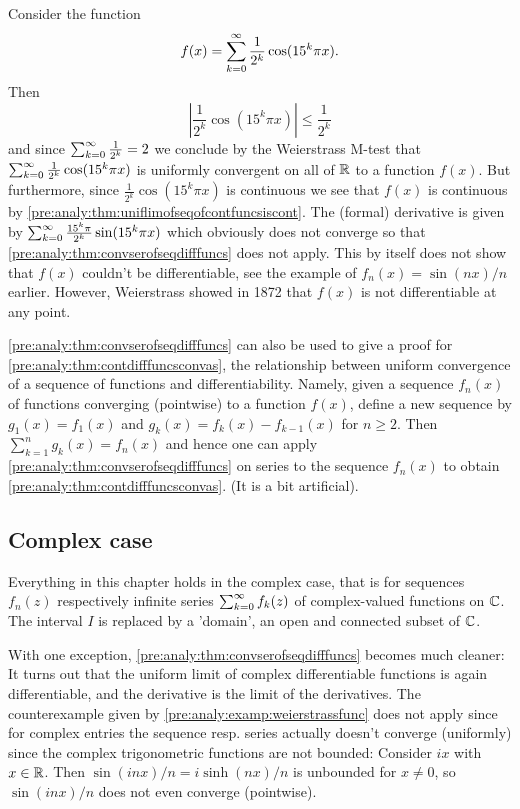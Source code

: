 \documentclass[10pt, a4paper]{article}
\begin{document}
\begin{example}\label{pre:analy:examp:weierstrassfunc}
    Consider the function
    \[
    f(x) = \sum_{k = 0}^{\infty}\frac{1}{2 ^ k}\cos(15 ^ k\pi x).
    \]
    Then
    \[
    \left|\frac{1}{2 ^ k}\cos(15 ^ k\pi x)\right| \leq \frac{1}{2 ^ k}
    \]
    and since $\sum_{k = 0}^{\infty}\frac{1}{2 ^ k} = 2$ we conclude by the Weierstrass M-test that $\sum_{k = 0}^{\infty}\frac{1}{2 ^ k}\cos(15 ^ k\pi x)$ is uniformly convergent on all of $\mathbb{R}$ to a function $f(x)$.
    But furthermore,
    since $\frac{1}{2 ^ k}\cos(15 ^ k\pi x)$ is continuous we see that $f(x)$ is continuous by \autoref{pre:analy:thm:uniflimofseqofcontfuncsiscont}.
    The
    (formal)
    derivative is given by $\sum_{k = 0}^{\infty}\frac{15 ^ k\pi}{2 ^ k}\sin(15 ^ k\pi x)$ which obviously does not converge so that \autoref{pre:analy:thm:convserofseqdifffuncs} does not apply.
    This by itself does not show that $f(x)$ couldn't be differentiable,
    see the example of $f_n(x) = \sin(nx) / n$ earlier.
    However,
    Weierstrass showed in 1872 that $f(x)$ is not differentiable at any point.
\end{example}

\begin{remark}
    \autoref{pre:analy:thm:convserofseqdifffuncs} can also be used to give a proof for \autoref{pre:analy:thm:contdifffuncsconvas},
    the relationship between uniform convergence of a sequence of functions and differentiability.
    Namely,
    given a sequence $f_n(x)$ of functions converging
    (pointwise)
    to a function $f(x)$,
    define a new sequence by $g_1(x) = f_1(x)$ and $g_k(x) = f_k(x) - f_{k - 1}(x)$ for $n \geq 2$.
    Then $\sum_{k = 1}^{n}g_k(x) = f_n(x)$ and hence one can apply \autoref{pre:analy:thm:convserofseqdifffuncs} on series to the sequence $f_n(x)$ to obtain \autoref{pre:analy:thm:contdifffuncsconvas}.
    (It is a bit artificial).
\end{remark}

\subsection{Complex case}

Everything in this chapter holds in the complex case,
that is for sequences $f_n(z)$ respectively infinite series $\sum_{k = 0}^{\infty} f_k(z)$ of complex-valued functions on $\mathbb{C}$.
The interval $I$ is replaced by a 'domain',
an open and connected subset of $\mathbb{C}$.

With one exception,
\autoref{pre:analy:thm:convserofseqdifffuncs} becomes much cleaner:
It turns out that the uniform limit of complex differentiable functions is again differentiable,
and the derivative is the limit of the derivatives.
The counterexample given by \autoref{pre:analy:examp:weierstrassfunc} does not apply since for complex entries the sequence resp. series actually doesn't converge
(uniformly)
since the complex trigonometric functions are not bounded:
Consider $ix$ with $x \in \mathbb{R}$.
Then $\sin(inx) / n = i\sinh(nx) / n$ is unbounded for $x \neq 0$,
so $\sin(inx) / n$ does not even converge
(pointwise).
\end{document}
